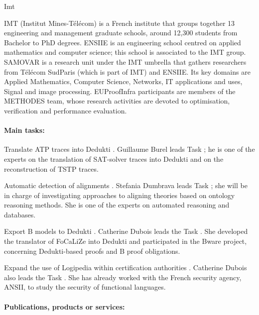 \begin{sitedescription}{Imt}


IMT (Institut Mines-T\'el\'ecom) is a French institute that groups together 13 engineering and management graduate schools, around 12,300 students from Bachelor to PhD degrees.
ENSIIE is an engineering school centred on applied mathematics and computer science; this school is associated to the IMT group. SAMOVAR is a research unit under the IMT umbrella that gathers researchers from T\'el\'ecom SudParis (which is part of IMT) and ENSIIE. Its key domains are Applied Mathematics,  Computer Science, Networks, IT applications and uses, Signal and image processing. EUProofInfra participants are members of the METHODES team, whose research activities are devoted to
optimisation, verification and performance evaluation.

\paragraph*{Main tasks:}

\begin{compactitem}
\item Translate ATP traces into Dedukti . Guillaume Burel leads Task ; he is one
of the experts on the translation of SAT-solver traces into Dedukti and on the reconstruction of TSTP traces.
\item Automatic detection of alignments . Stefania Dumbrava leads Task ; she will be 
in charge of investigating approaches to aligning theories based on ontology reasoning methods. She is one of the experts on automated reasoning and databases.
\item Export B models to Dedukti . Catherine Dubois leads the Task . She developed the translator of FoCaLiZe into Dedukti and 
participated in the Bware project, concerning Dedukti-based proofs and B proof obligations.
\item Expand the use of Logipedia within certification authorities . Catherine Dubois also leads the Task . She has already worked 
with the French security agency, ANSII, to study the security of functional languages.
\end{compactitem}

\paragraph*{Publications, products or services:}


\end{sitedescription}
